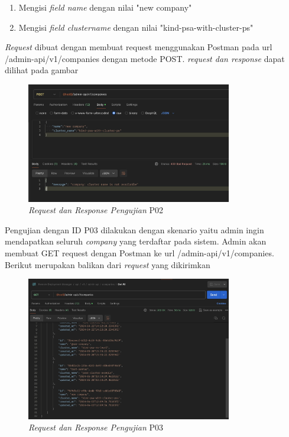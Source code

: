 \begin{enumerate}
  \item Mengisi \textit{field name} dengan nilai "new company"
  \item Mengisi \textit{field cluster\textunderscore name} dengan nilai "kind-psa-with-cluster-ps"
\end{enumerate}

\textit{Request} dibuat dengan membuat request menggunakan Postman pada url /admin-api/v1/companies dengan metode POST. \textit{request dan response} dapat dilihat pada gambar

\begin{figure}[ht]
  \centering
  \includegraphics[width=0.8\textwidth]{resources/chapter-4/pengujian/p02.jpg}
  \caption{\textit{Request dan Response Pengujian} P02}
  \label{fig:pengujian-p02}
\end{figure}

Pengujian dengan ID P03 dilakukan dengan skenario yaitu admin ingin mendapatkan seluruh \textit{company} yang terdaftar pada sistem. Admin akan membuat GET request dengan Postman ke url /admin-api/v1/companies. Berikut merupakan balikan dari \textit{request} yang dikirimkan

\begin{figure}[ht]
  \centering
  \includegraphics[width=0.8\textwidth]{resources/chapter-4/pengujian/p03.jpg}
  \caption{\textit{Request dan Response Pengujian} P03}
  \label{fig:pengujian-p03}
\end{figure}

